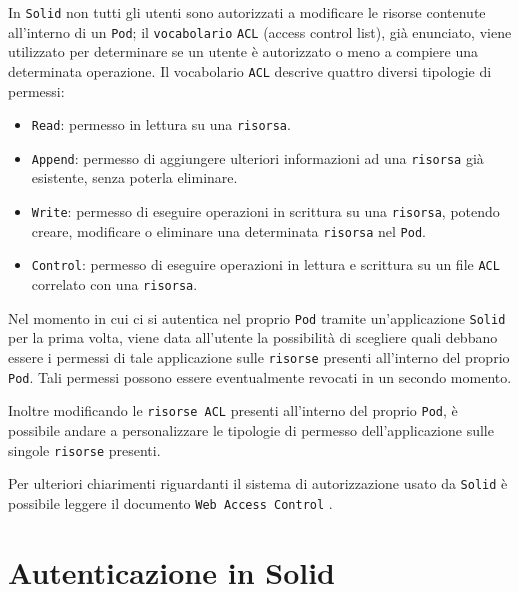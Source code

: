 \medskip

In {\tt Solid} non tutti gli utenti sono autorizzati a modificare le risorse contenute all'interno di un {\tt Pod}; il {\tt vocabolario} {\tt ACL} (access control list), già enunciato, viene utilizzato per determinare se un utente è autorizzato o meno a compiere una determinata operazione. Il vocabolario {\tt ACL} descrive quattro diversi tipologie di permessi:

\medskip

\begin{itemize}
	\item {\tt Read}: permesso in lettura su una {\tt risorsa}.
	\item {\tt Append}: permesso di aggiungere ulteriori informazioni ad una {\tt risorsa} già\\ esistente, senza poterla eliminare.
	\item {\tt Write}: permesso di eseguire operazioni in scrittura su una {\tt risorsa}, potendo creare, modificare o eliminare una determinata {\tt risorsa} nel {\tt Pod}.
	\item {\tt Control}: permesso di eseguire operazioni in lettura e scrittura su un file {\tt ACL} correlato con una {\tt risorsa}.
\end{itemize}

\medskip

Nel momento in cui ci si autentica nel proprio {\tt Pod} tramite un'applicazione {\tt Solid} per la prima volta, viene data all'utente la possibilità di scegliere quali debbano essere i permessi di tale applicazione sulle {\tt risorse} presenti all'interno del proprio {\tt Pod}. Tali permessi possono essere eventualmente revocati in un secondo momento.

\medskip

Inoltre modificando le {\tt risorse ACL} presenti all'interno del proprio {\tt Pod}, è possibile andare a personalizzare le tipologie di permesso dell'applicazione sulle singole {\tt risorse} presenti.
\medskip

Per ulteriori chiarimenti riguardanti il sistema di autorizzazione usato da {\tt Solid} è possibile leggere il documento {\tt Web Access Control} \cite{wac}.

\bigskip

\section{Autenticazione in Solid}

\medskip

